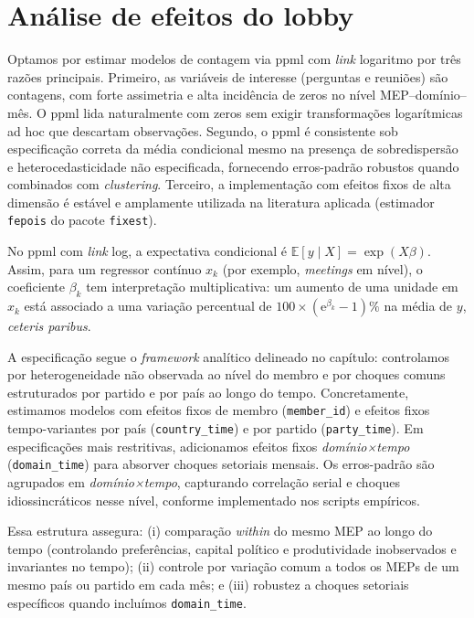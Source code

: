 \section{Análise de efeitos do lobby}
\label{sec:resultados_efeitos}


Optamos por estimar modelos de contagem via \acrshort{ppml} com \textit{link} logaritmo por três razões principais. Primeiro, as variáveis de interesse (perguntas e reuniões) são contagens, com forte assimetria e alta incidência de zeros no nível MEP–domínio–mês. O \acrshort{ppml} lida naturalmente com zeros sem exigir transformações logarítmicas ad hoc que descartam observações. Segundo, o \acrshort{ppml} é consistente sob especificação correta da média condicional mesmo na presença de sobredispersão e heterocedasticidade não especificada, fornecendo erros-padrão robustos quando combinados com \textit{clustering}. Terceiro, a implementação com efeitos fixos de alta dimensão é estável e amplamente utilizada na literatura aplicada (estimador \texttt{fepois} do pacote \texttt{fixest}).

No \acrshort{ppml} com \textit{link} log, a expectativa condicional é \(\mathbb{E}[y\mid X] = \exp(X\beta)\). Assim, para um regressor contínuo \(x_k\) (por exemplo, \textit{meetings} em nível), o coeficiente \(\beta_k\) tem interpretação multiplicativa: um aumento de uma unidade em \(x_k\) está associado a uma variação percentual de \(100\times(\mathrm{e}^{\beta_k}-1)\%\) na média de \(y\), \textit{ceteris paribus}.

A especificação segue o \textit{framework} analítico delineado no capítulo: controlamos por heterogeneidade não observada ao nível do membro e por choques comuns estruturados por partido e por país ao longo do tempo. Concretamente, estimamos modelos com efeitos fixos de membro (\texttt{member\_id}) e efeitos fixos tempo-variantes por país (\texttt{country\_time}) e por partido (\texttt{party\_time}). Em especificações mais restritivas, adicionamos efeitos fixos \textit{domínio×tempo} (\texttt{domain\_time}) para absorver choques setoriais mensais. Os erros-padrão são agrupados em \textit{domínio×tempo}, capturando correlação serial e choques idiossincráticos nesse nível, conforme implementado nos scripts empíricos.

Essa estrutura assegura: (i) comparação \textit{within} do mesmo MEP ao longo do tempo (controlando preferências, capital político e produtividade inobservados e invariantes no tempo); (ii) controle por variação comum a todos os MEPs de um mesmo país ou partido em cada mês; e (iii) robustez a choques setoriais específicos quando incluímos \texttt{domain\_time}.

